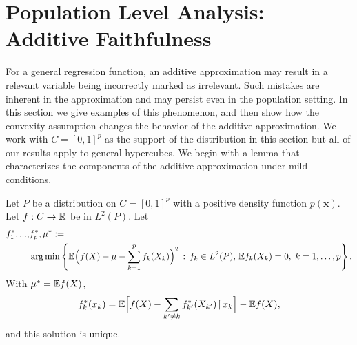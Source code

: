 
\section{Population Level Analysis: Additive Faithfulness}
\label{sec:additivefaithful}

For a general regression function, an additive approximation may result in a
relevant variable being incorrectly marked as irrelevant. Such
mistakes are inherent in the approximation and may persist even in
the population setting.  In this section we give
examples of this phenomenon, and then show how the convexity
assumption
changes the behavior of the additive approximation. We work with $C=[0,1]^p$ as the support of the distribution in this section but all of our results apply to general hypercubes. We begin
with a lemma that characterizes the components of the additive approximation under mild conditions. 



\begin{lemma}
\label{lem:general_int_reduction}
Let $P$ be a distribution on $C=[0,1]^p$ with a positive density
function $p(\mathbf{x})$. Let $f: C \rightarrow {\mathbb R}$ be in $L^2(P)$. Let
\begin{align*}
f^*_1,...,&f^*_p, \mu^* :=  \\
&\arg\min \left\{ {\mathbb E} \Bigl( f(X) - \mu - \sum_{k=1}^p f_k(X_k)\Bigr)^2 \,:\,
f_k \in L^2(P),\, {\mathbb E} f_k(X_k) = 0,\; k=1,\ldots, p \right\}.
\end{align*}
With $\mu^* = {\mathbb E} f(X)$, 
\begin{equation}
\label{eq:backfit}
f^*_k(x_k) = {\mathbb E}\Bigl[ f(X) - \sum_{k' \neq k} f^*_{k'}(X_{k'}) {\,|\,}
x_k\Bigr] - {\mathbb E} f(X), 
\end{equation}
and this solution is unique. 
\end{lemma}



